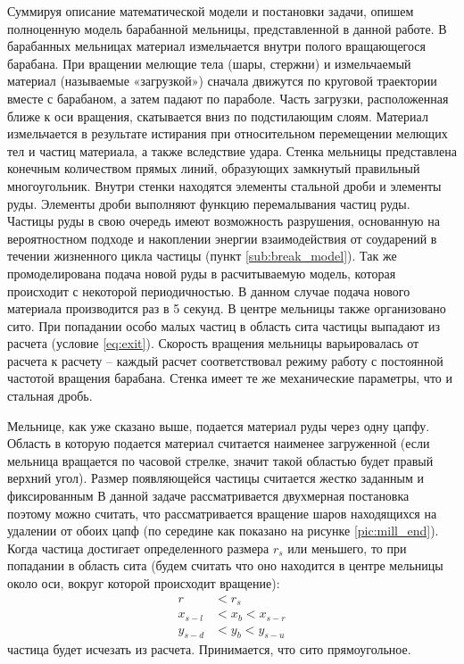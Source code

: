 \documentclass[utf8x, 14pt, oneside, a4paper]{article}
\begin{document}
Суммируя описание математической модели и постановки задачи, опишем полноценную модель барабанной мельницы, представленной в данной работе.
В барабанных мельницах материал измельчается внутри полого вращающегося барабана. 
При вращении мелющие тела (шары, стержни) и измельчаемый материал (называемые «загрузкой») сначала движутся по круговой траектории вместе с барабаном, а затем падают по параболе. Часть загрузки, расположенная ближе к оси вращения, скатывается вниз по подстилающим слоям. 
Материал измельчается в результате истирания при относительном перемещении мелющих тел и частиц материала, а также вследствие удара.
Стенка мельницы представлена конечным количеством прямых линий, образующих замкнутый правильный многоугольник.
Внутри стенки находятся элементы стальной дроби и элементы руды.
Элементы дроби выполняют функцию перемалывания частиц руды.
Частицы руды в свою очередь имеют возможность разрушения, основанную на вероятностном подходе и накоплении энергии взаимодействия от соударений в течении жизненного цикла частицы (пункт \ref{sub:break_model}).
Так же промоделирована подача новой руды в расчитываемую модель, которая происходит с некоторой периодичностью.
В данном случае подача нового материала производится раз в 5 секунд.
В центре мельницы также организовано сито.
При попадании особо малых частиц в область сита частицы выпадают из расчета (условие \ref{eq:exit}).
Скорость вращения мельницы варьировалась от расчета к расчету -- каждый расчет соответствовал режиму работу с постоянной частотой вращения барабана.
Стенка имеет те же механические параметры, что и стальная дробь.

Мельнице, как уже сказано выше, подается материал руды через одну цапфу.
Область в которую подается материал считается наименее загруженной (если мельница вращается по часовой стрелке, значит такой областью будет правый верхний угол).
Размер появляющейся частицы считается жестко заданным и фиксированным
В данной задаче рассматривается двухмерная постановка поэтому можно считать, что рассматривается вращение шаров находящихся на удалении от обоих цапф (по середине как показано на рисунке \ref{pic:mill_end}).
Когда частица достигает определенного размера $r_{s}$ или меньшего, то при попадании в область сита (будем считать что оно находится в центре мельницы около оси, вокруг которой происходит вращение):
\begin{align}
\label{eq:exit}
r &< r_s \\
x_{s-l} &< x_b < x_{s-r} \\
y_{s-d} &< y_b < y_{s-u}
\end{align}
частица будет исчезать из расчета. Принимается, что сито прямоугольное.
\end{document}
